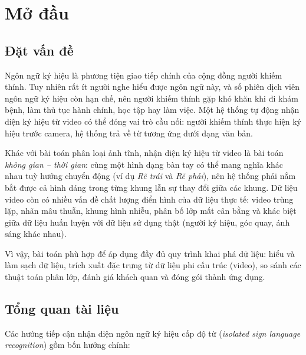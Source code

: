 \section{Mở đầu}
\label{sec:intro}

\subsection{Đặt vấn đề}
\label{subsec:problem}

Ngôn ngữ ký hiệu là phương tiện giao tiếp chính của cộng đồng người khiếm thính. Tuy nhiên rất ít người nghe hiểu được ngôn ngữ này, và số phiên dịch viên ngôn ngữ ký hiệu còn hạn chế, nên người khiếm thính gặp khó khăn khi đi khám bệnh, làm thủ tục hành chính, học tập hay làm việc. Một hệ thống tự động nhận diện ký hiệu từ video có thể đóng vai trò cầu nối: người khiếm thính thực hiện ký hiệu trước camera, hệ thống trả về từ tương ứng dưới dạng văn bản.

Khác với bài toán phân loại ảnh tĩnh, nhận diện ký hiệu từ video là bài toán \emph{không gian -- thời gian}: cùng một hình dạng bàn tay có thể mang nghĩa khác nhau tuỳ hướng chuyển động (ví dụ \textit{Rẽ trái} và \textit{Rẽ phải}), nên hệ thống phải nắm bắt được cả hình dáng trong từng khung lẫn sự thay đổi giữa các khung. Dữ liệu video còn có nhiều vấn đề chất lượng điển hình của dữ liệu thực tế: video trùng lặp, nhãn mâu thuẫn, khung hình nhiễu, phân bố lớp mất cân bằng và khác biệt giữa dữ liệu huấn luyện với dữ liệu sử dụng thật (người ký hiệu, góc quay, ánh sáng khác nhau).

Vì vậy, bài toán phù hợp để áp dụng đầy đủ quy trình khai phá dữ liệu: hiểu và làm sạch dữ liệu, trích xuất đặc trưng từ dữ liệu phi cấu trúc (video), so sánh các thuật toán phân lớp, đánh giá khách quan và đóng gói thành ứng dụng.

\subsection{Tổng quan tài liệu}
\label{subsec:related}

Các hướng tiếp cận nhận diện ngôn ngữ ký hiệu cấp độ từ (\textit{isolated sign language recognition}) gồm bốn hướng chính:

